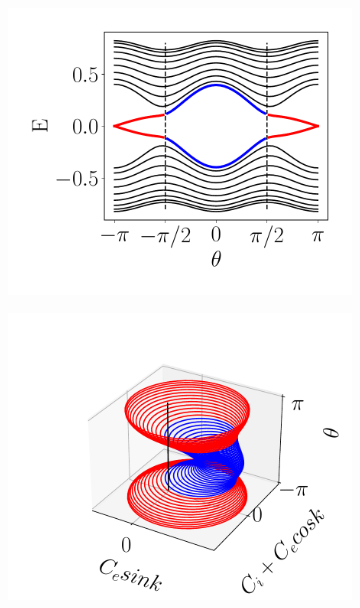 \begin{figure}[h!]
     \centering
    \captionsetup[sub]{font=small}

     \begin{subfigure}[b!]{0.27 \textwidth}
         \caption{}
         \includegraphics[width=\textwidth]{Imagenes/Shh_images/bands_shh_pump.pdf}
         \label{}
     \end{subfigure}\hspace*{-0.9em}
     \begin{subfigure}[b!]{0.27 \textwidth}
         \caption{}
         \includegraphics[width=\textwidth]{Imagenes/Shh_images/loop_pump_ssh.pdf}

\end{subfigure}
\end{figure}
